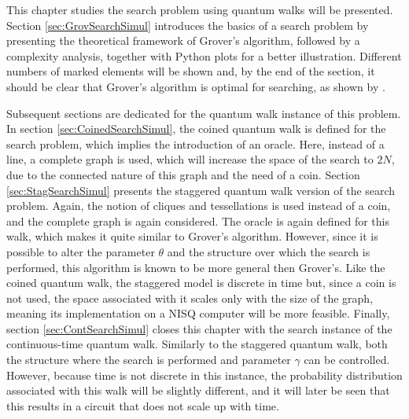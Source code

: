 \documentclass[../../dissertation.tex]{subfiles}
\begin{document}
This chapter studies the search problem
using quantum walks will be presented. Section \ref{sec:GrovSearchSimul}
introduces the basics of a search problem by presenting the theoretical
framework of Grover's algorithm, followed by a complexity analysis, together
with Python plots for a better illustration. Different numbers of marked
elements will be shown and, by the end of the section, it should be clear that
Grover's algorithm is optimal for searching, as shown by \cite{zalka1999}.\par

Subsequent sections are dedicated for the quantum walk instance of this
problem. In section \ref{sec:CoinedSearchSimul}, the coined quantum
walk is defined for the search problem, which implies the introduction of an
oracle. Here, instead of a line, a complete graph is used, which will
increase the space of the search to $2N$, due to the connected nature of this
graph and the need of a coin. Section \ref{sec:StagSearchSimul} presents the
staggered quantum walk version of the search problem. Again, the notion of
cliques and tessellations is used instead of a coin, and the complete graph is
again considered. The oracle is again defined for this walk, which makes it
quite similar to Grover's algorithm. However, since it is possible to alter the
parameter $\theta$ and the structure over which the search is performed, this
algorithm is known to be more general then Grover's. Like the coined
quantum walk, the staggered model is discrete in time but, since a coin is not used,
the space associated with it scales only with the size of the graph, meaning
its implementation on a NISQ computer will be more feasible. Finally, section
\ref{sec:ContSearchSimul} closes this chapter with the search instance of the
continuous-time quantum walk. Similarly to the staggered quantum walk, both the
structure where the search is performed and parameter $\gamma$ can be
controlled. However, because time is not discrete in this instance, the
probability distribution associated with this walk will be slightly different,
and it will later be seen that this results in a circuit that does not scale up
with time.  
\end{document}
